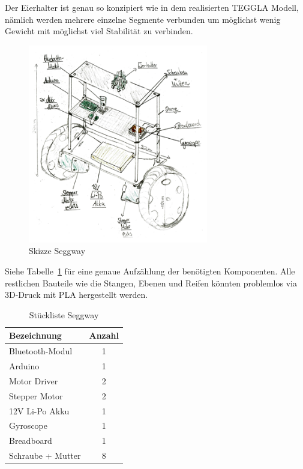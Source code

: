 Der Eierhalter ist genau so konzipiert wie in dem realisierten TEGGLA Modell, nämlich werden mehrere einzelne Segmente verbunden um möglichst wenig Gewicht mit möglichst viel Stabilität zu verbinden.

\begin{figure}[H]
	\centering
	\includegraphics[width=0.7\textwidth]{bilder/seggway.png}
	\caption{Skizze Seggway}
	\label{bild:seggway}
\end{figure}

Siehe Tabelle~\ref{table:seggway} für eine genaue Aufzählung der benötigten Komponenten. 
Alle restlichen Bauteile wie die Stangen, Ebenen und Reifen könnten problemlos via 3D-Druck mit PLA hergestellt werden.

\begin{table}[H]
	\centering
\begin{tabular}{lc}
	Bezeichnung & Anzahl \\
	\midrule[2pt]
	Bluetooth-Modul & 1\\
	\midrule
	Arduino & 1 \\
	\midrule
	Motor Driver & 2 \\
	\midrule
	Stepper Motor & 2 \\
	\midrule
	12V Li-Po Akku & 1 \\
	\midrule
	Gyroscope & 1 \\
	\midrule
	Breadboard & 1 \\
	\midrule
	Schraube + Mutter & 8 \\

\end{tabular} 
\caption{Stückliste Seggway} 
\label{table:seggway}
\end{table} 


